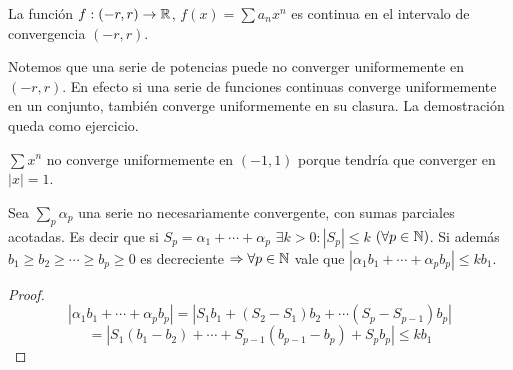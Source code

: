 \begin{corollary}
  La función $f: (-r, r) \to \mathbb{R}$, $f(x) = \sum a_n x^n$ es continua en el intervalo de convergencia $(-r, r)$.
\end{corollary}

Notemos que una serie de potencias puede no converger uniformemente en $(-r, r)$. En efecto si una serie de funciones continuas converge uniformemente en un conjunto, también converge uniformemente en su clasura. La demostración queda como ejercicio.

\begin{eg}
  $\sum x^n$ no converge uniformemente en $(-1, 1)$ porque tendría que converger en $|x| = 1$.
\end{eg}

\clearpage

\begin{lemma}
  Sea $\sum_p \alpha_p$ una serie no necesariamente convergente, con sumas parciales acotadas. Es decir que si $S_p = \alpha_1 + \cdots + \alpha_p$ $\exists k > 0 : |S_p| \leq k$ $(\forall p \in \mathbb{N})$.
  Si además $b_1 \geq b_2 \geq \cdots \geq b_p \geq 0$ es decreciente $\Rightarrow \forall p \in \mathbb{N}$ vale que $|\alpha_1 b_1 + \cdots + \alpha_p b_p| \leq k b_1$.
  \begin{proof}
    \begin{equation}
      |\alpha_1 b_1 + \cdots + \alpha_p b_p| = |S_1 b_1 + (S_2 - S_1) b_2 + \cdots (S_p - S_{p-1}) b_p|
    \end{equation}
    \begin{equation}
      = |S_1 (b_1 - b_2) + \cdots + S_{p-1} (b_{p-1} - b_p) + S_p b_p| \leq k b_1
    \end{equation}
  \end{proof}
\end{lemma}

